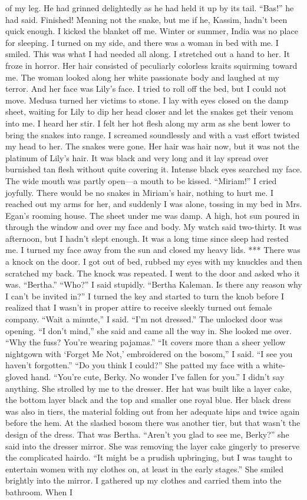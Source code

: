 \documentclass{novel}
\begin{document}
of my leg. He had grinned delightedly as he had held it up by its tail. “Bas!” he had said. Finished! Meaning not the snake, but me if he, Kassim, hadn’t been quick enough. I kicked the blanket off me. Winter or summer, India was no place for sleeping. I turned on my side, and there was a woman in bed with me. I smiled. This was what I had needed all along. I stretched out a hand to her. It froze in horror. Her hair consisted of peculiarly colorless kraits squirming toward me. The woman looked along her white passionate body and laughed at my terror. And her face was Lily’s face. I tried to roll off the bed, but I could not move. Medusa turned her victims to stone. I lay with eyes closed on the damp sheet, waiting for Lily to dip her head closer and let the snakes get their venom into me. I heard her stir. I felt her hot flesh along my arm as she bent lower to bring the snakes into range. I screamed soundlessly and with a vast effort twisted my head to her. The snakes were gone. Her hair was hair now, but it was not the platinum of Lily’s hair. It was black and very long and it lay spread over burnished tan flesh without quite covering it. Intense black eyes searched my face. The wide mouth was partly open—a mouth to be kissed. “Miriam!” I cried joyfully. There would be no snakes in Miriam’s hair, nothing to hurt me. I reached out my arms for her, and suddenly I was alone, tossing in my bed in Mrs. Egan’s rooming house. The sheet under me was damp. A high, hot sun poured in through the window and over my face and body. My watch said two-thirty. It was afternoon, but I hadn’t slept enough. It was a long time since sleep had rested me. I turned my face away from the sun and closed my heavy lids. *** There was a knock on the door. I got out of bed, rubbed my eyes with my knuckles and then scratched my back. The knock was repeated. I went to the door and asked who it was. “Bertha.” “Who?” I said stupidly. “Bertha Kaleman. Is there any reason why I can’t be invited in?” I turned the key and started to turn the knob before I realized that I wasn’t in proper attire to receive sleekly turned out female company. “Wait a minute,” I said. “I’m not dressed.” The unlocked door was opening. “I don’t mind,” she said and came all the way in. She looked me over. “Why the fuss? You’re wearing pajamas.” “It covers more than a sheer yellow nightgown with ‘Forget Me Not,’ embroidered on the bosom,” I said. “I see you haven’t forgotten.” “Do you think I could?” She patted my face with a white-gloved hand. “You’re cute, Berky. No wonder I’ve fallen for you.” I didn’t say anything. She strolled by me to the dresser. Her hat was built like a layer cake, the bottom layer black and the top and smaller one royal blue. Her black dress was also in tiers, the material folding out from her adequate hips and twice again before the hem. At the slashed bosom there was another tier, but that wasn’t the design of the dress. That was Bertha. “Aren’t you glad to see me, Berky?” she said into the dresser mirror. She was removing the layer cake gingerly to preserve the complicated hairdo. “It might be a prudish upbringing, but I was taught to entertain women with my clothes on, at least in the early stages.” She smiled brightly into the mirror. I gathered up my clothes and carried them into the bathroom. When I 
\end{document}
